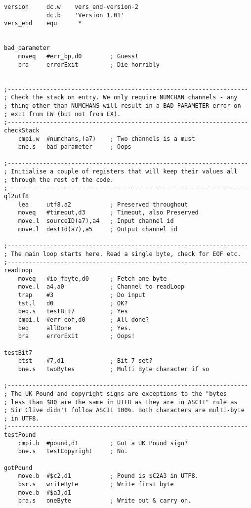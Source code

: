 \begin{lstlisting}[firstnumber=1, caption={Wolfgang's improved ql2utf8 Utility}]
version     dc.w    vers_end-version-2
            dc.b    'Version 1.01'
vers_end    equ      *


bad_parameter
    moveq   #err_bp,d0        ; Guess!
    bra     errorExit         ; Die horribly


;--------------------------------------------------------------------
; Check the stack on entry. We only require NUMCHAN channels - any
; thing other than NUMCHANS will result in a BAD PARAMETER error on
; exit from EW (but not from EX).
;--------------------------------------------------------------------
checkStack
    cmpi.w  #numchans,(a7)    ; Two channels is a must
    bne.s   bad_parameter     ; Oops

;--------------------------------------------------------------------
; Initialise a couple of registers that will keep their values all
; through the rest of the code.
;--------------------------------------------------------------------
ql2utf8
    lea     utf8,a2           ; Preserved throughout
    moveq   #timeout,d3       ; Timeout, also Preserved
    move.l  sourceID(a7),a4   ; Input channel id
    move.l  destId(a7),a5     ; Output channel id

;--------------------------------------------------------------------
; The main loop starts here. Read a single byte, check for EOF etc.
;--------------------------------------------------------------------
readLoop
    moveq   #io_fbyte,d0      ; Fetch one byte
    move.l  a4,a0             ; Channel to readLoop
    trap    #3                ; Do input
    tst.l   d0                ; OK?
    beq.s   testBit7          ; Yes
    cmpi.l  #err_eof,d0       ; All done?
    beq     allDone           ; Yes.
    bra     errorExit         ; Oops!

testBit7
    btst    #7,d1             ; Bit 7 set?
    bne.s   twoBytes          ; Multi Byte character if so

;--------------------------------------------------------------------
; The UK Pound and copyright signs are exceptions to the "bytes 
; less than $80 are the same in UTF8 as they are in ASCII" rule as 
; Sir Clive didn't follow ASCII 100%. Both characters are multi-byte
; in UTF8.
;--------------------------------------------------------------------
testPound
    cmpi.b  #pound,d1         ; Got a UK Pound sign?
    bne.s   testCopyright     ; No.

gotPound
    move.b  #$c2,d1           ; Pound is $C2A3 in UTF8.
    bsr.s   writeByte         ; Write first byte
    move.b  #$a3,d1
    bra.s   oneByte           ; Write out & carry on.


\end{lstlisting}
